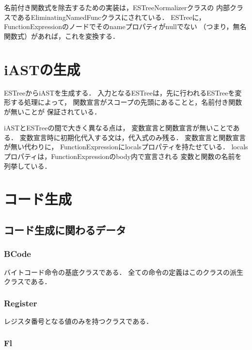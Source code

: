 \documentclass[a4j,12pt]{jarticle}
\begin{document}
名前付き関数式を除去するための実装は，ESTreeNormalizerクラスの
内部クラスであるEliminatingNamedFuncクラスにされている．
ESTreeに，FunctionExpressionのノードでそのnameプロパティがnullでない
（つまり，無名関数式）があれば，これを変換する．




\section{iASTの生成}

ESTreeからiASTを生成する．
入力となるESTreeは，先に行われるESTreeを変形する処理によって，
関数宣言がスコープの先頭にあることと，名前付き関数が無いことが
保証されている．

iASTとESTreeの間で大きく異なる点は，
変数宣言と関数宣言が無いことである．
変数宣言時に初期化代入する文は，代入式のみ残る．
変数宣言と関数宣言が無い代わりに，
FunctionExpressionにlocalsプロパティを持たせている．
localsプロパティは，FunctionExpressionのbody内で宣言される
変数と関数の名前を列挙している．






\section{コード生成}

\subsection{コード生成に関わるデータ}

\subsubsection{BCode}

バイトコード命令の基底クラスである．
全ての命令の定義はこのクラスの派生クラスである．

\subsubsection{Register}

レジスタ番号となる値のみを持つクラスである．

\subsubsection{Fl}
\end{document}
